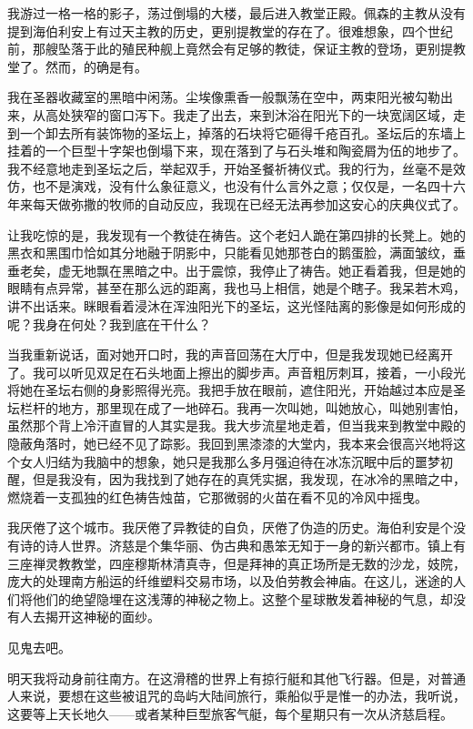 \documentclass[AutoFakeBold=true]{book}
\begin{document}
我游过一格一格的影子，荡过倒塌的大楼，最后进入教堂正殿。佩森的主教从没有提到海伯利安上有过天主教的历史，更别提教堂的存在了。很难想象，四个世纪前，那艘坠落于此的殖民种舰上竟然会有足够的教徒，保证主教的登场，更别提教堂了。然而，的确是有。

我在圣器收藏室的黑暗中闲荡。尘埃像熏香一般飘荡在空中，两束阳光被勾勒出来，从高处狭窄的窗口泻下。我走了出去，来到沐浴在阳光下的一块宽阔区域，走到一个卸去所有装饰物的圣坛上，掉落的石块将它砸得千疮百孔。圣坛后的东墙上挂着的一个巨型十字架也倒塌下来，现在落到了与石头堆和陶瓷屑为伍的地步了。我不经意地走到圣坛之后，举起双手，开始圣餐祈祷仪式。我的行为，丝毫不是效仿，也不是演戏，没有什么象征意义，也没有什么言外之意；仅仅是，一名四十六年来每天做弥撒的牧师的自动反应，我现在已经无法再参加这安心的庆典仪式了。

让我吃惊的是，我发现有一个教徒在祷告。这个老妇人跪在第四排的长凳上。她的黑衣和黑围巾恰如其分地融于阴影中，只能看见她那苍白的鹅蛋脸，满面皱纹，垂垂老矣，虚无地飘在黑暗之中。出于震惊，我停止了祷告。她正看着我，但是她的眼睛有点异常，甚至在那么远的距离，我也马上相信，她是个瞎子。我呆若木鸡，讲不出话来。眯眼看着浸沐在浑浊阳光下的圣坛，这光怪陆离的影像是如何形成的呢？我身在何处？我到底在干什么？

当我重新说话，面对她开口时，我的声音回荡在大厅中，但是我发现她已经离开了。我可以听见双足在石头地面上擦出的脚步声。声音粗厉刺耳，接着，一小段光将她在圣坛右侧的身影照得光亮。我把手放在眼前，遮住阳光，开始越过本应是圣坛栏杆的地方，那里现在成了一地碎石。我再一次叫她，叫她放心，叫她别害怕，虽然那个背上冷汗直冒的人其实是我。我大步流星地走着，但当我来到教堂中殿的隐蔽角落时，她已经不见了踪影。我回到黑漆漆的大堂内，我本来会很高兴地将这个女人归结为我脑中的想象，她只是我那么多月强迫待在冰冻沉眠中后的噩梦初醒，但是我没有，因为我找到了她存在的真凭实据，我发现，在冰冷的黑暗之中，燃烧着一支孤独的红色祷告烛苗，它那微弱的火苗在看不见的冷风中摇曳。

我厌倦了这个城市。我厌倦了异教徒的自负，厌倦了伪造的历史。海伯利安是个没有诗的诗人世界。济慈是个集华丽、伪古典和愚笨无知于一身的新兴都市。镇上有三座禅灵教教堂，四座穆斯林清真寺，但是拜神的真正场所是无数的沙龙，妓院，庞大的处理南方船运的纤维塑料交易市场，以及伯劳教会神庙。在这儿，迷途的人们将他们的绝望隐埋在这浅薄的神秘之物上。这整个星球散发着神秘的气息，却没有人去揭开这神秘的面纱。

见鬼去吧。

明天我将动身前往南方。在这滑稽的世界上有掠行艇和其他飞行器。但是，对普通人来说，要想在这些被诅咒的岛屿大陆间旅行，乘船似乎是惟一的办法，我听说，这要等上天长地久——或者某种巨型旅客气艇，每个星期只有一次从济慈启程。
\end{document}

